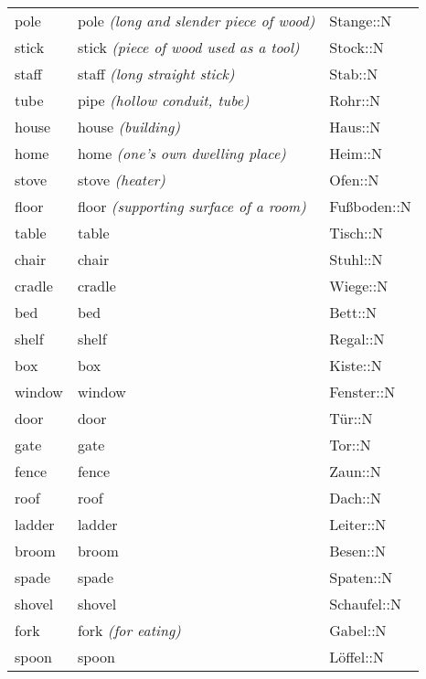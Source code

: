\begin{center}
\begin{longtable}{lll}
{\sc \lowercase{	POLE	}}	&	pole	\textit{\footnotesize (long and slender piece of wood)}	&	Stange::N	\\
{\sc \lowercase{	STICK	}}	&	stick	\textit{\footnotesize (piece of wood used as a tool)}	&	Stock::N	\\
{\sc \lowercase{	STAFF	}}	&	staff	\textit{\footnotesize (long straight stick)}	&	Stab::N	\\
{\sc \lowercase{	TUBE	}}	&	pipe	\textit{\footnotesize (hollow conduit, tube)}	&	Rohr::N	\\
{\sc \lowercase{	HOUSE	}}	&	house	\textit{\footnotesize (building)}	&	Haus::N	\\
{\sc \lowercase{	HOME	}}	&	home	\textit{\footnotesize (one’s own dwelling place)}	&	Heim::N	\\
{\sc \lowercase{	STOVE	}}	&	stove	\textit{\footnotesize (heater)}	&	Ofen::N	\\
{\sc \lowercase{	FLOOR	}}	&	floor	\textit{\footnotesize (supporting surface of a room)}	&	Fußboden::N	\\
{\sc \lowercase{	TABLE	}}	&	table		&	Tisch::N	\\
{\sc \lowercase{	CHAIR	}}	&	chair		&	Stuhl::N	\\
{\sc \lowercase{	CRADLE	}}	&	cradle		&	Wiege::N	\\
{\sc \lowercase{	BED	}}	&	bed		&	Bett::N	\\
{\sc \lowercase{	SHELF	}}	&	shelf		&	Regal::N	\\
{\sc \lowercase{	BOX	}}	&	box		&	Kiste::N	\\
{\sc \lowercase{	WINDOW	}}	&	window		&	Fenster::N	\\
{\sc \lowercase{	DOOR	}}	&	door		&	Tür::N	\\
{\sc \lowercase{	GATE	}}	&	gate		&	Tor::N	\\
{\sc \lowercase{	FENCE	}}	&	fence		&	Zaun::N	\\
{\sc \lowercase{	ROOF	}}	&	roof		&	Dach::N	\\
{\sc \lowercase{	LADDER	}}	&	ladder		&	Leiter::N	\\
{\sc \lowercase{	BROOM	}}	&	broom		&	Besen::N	\\
{\sc \lowercase{	SPADE	}}	&	spade		&	Spaten::N	\\
{\sc \lowercase{	SHOVEL	}}	&	shovel		&	Schaufel::N	\\
{\sc \lowercase{	FORK	}}	&	fork	\textit{\footnotesize (for eating)}	&	Gabel::N	\\
{\sc \lowercase{	SPOON	}}	&	spoon		&	Löffel::N	\\

\end{longtable}
\end{center}
